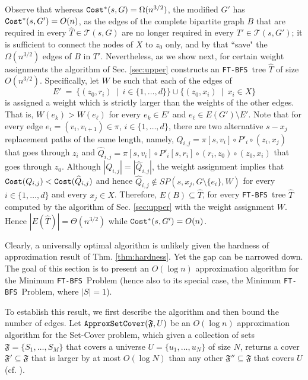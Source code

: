 \documentclass[12pt]{article}
\def\Set{\mathfrak{F}}
\def\Cost{\mbox{\tt Cost}}
\def\FTBFS{\mbox{\tt FT-BFS}}
\def\ApproxSetCover{\mbox{\tt ApproxSetCover}}
\begin{document}
Observe that whereas $\Cost^*(s, G)=\Omega(n^{3/2})$,
the modified $G'$ has $\Cost^*(s, G')=O(n)$, as the edges of the
complete bipartite graph $B$ that are required in
every $\widehat{T} \in \mathcal{T}(s,G)$
are no longer required in every $T' \in \mathcal{T}(s,G')$;
it is sufficient to connect the nodes of $X$ to $z_0$ only,
and by that ``save" the $\Omega(n^{3/2})$ edges of $B$ in $T'$.
Nevertheless, as we show next, for certain weight assignments the algorithm of
Sec. \ref{sec:upper} constructs an \FTBFS\ tree $\widehat{T}$ of size
$O(n^{3/2})$.
Specifically, let $W$ be such that each of the edges of
$$E' ~=~
\{(z_0,r_i) ~\mid~ i\in \{1, \ldots, d\}\} \cup \{(z_0,x_i) ~\mid~ x_i \in X\}$$
is assigned a weight which is strictly larger than the weights of the other edges. That is, $W(e_k)>W(e_\ell)$ for every $e_k \in E'$ and
$e_{\ell} \in E(G')\setminus E'$.
Note that for every edge $e_i=(v_{i}, v_{i+1})\in \pi$, $i \in \{1, \ldots,d\}$,
there are two alternative $s-x_j$ replacement paths of the same length, namely,
$Q_{i,j}=\pi[s, v_i] \circ P'_i \circ (z_i, x_j)$ that goes through $z_i$
and $\widehat{Q}_{i,j}=\pi[s, v_i] \circ P'_i[s, r_i] \circ (r_i,z_0) \circ (z_0,x_i)$
that goes through $z_0$. Although $|Q_{i,j}|=|\widehat{Q}_{i,j}|$,
the weight assignment implies that
$\Cost(Q_{i,j})<\Cost(\widehat{Q}_{i,j})$
and hence $\widehat{Q}_{i,j} \notin SP(s, x_j, G \setminus \{e_i\},W)$ for
every $i \in \{1, \ldots,d\}$ and every $x_j \in X$.
Therefore, $E(B) \subseteq  \widehat{T}$, for every \FTBFS\ tree
$\widehat{T}$ computed by the
algorithm of Sec. \ref{sec:upper} with the weight assignment $W$.
Hence $|E(\widehat{T})|=\Theta(n^{3/2})$ while $\Cost^*(s, G')=O(n)$.

Clearly, a universally optimal algorithm is unlikely given the hardness
of approximation result of Thm. \ref{thm:hardness}.
Yet the gap can be narrowed down.
The goal of this section is to present an $O(\log n)$ approximation algorithm
for the Minimum \FTBFS\ Problem (hence also to its special case,
the Minimum \FTBFS\ Problem, where $|S|=1$).

To establish this result, we first describe the algorithm and
then bound the number of edges.
Let $\ApproxSetCover(\Set,U)$ be an $O(\log n)$
approximation algorithm for the Set-Cover problem,
which given a collection of sets $\Set=\{S_1, \ldots, S_{M}\}$
that covers a universe $U=\{u_1, \ldots, u_N\}$ of size $N$, returns a cover
$\Set' \subseteq \Set$ that is larger by at most
$O(\log N)$ than any other $\Set'' \subseteq \Set$ that covers $U$ (cf. \cite{Vazirani97}).
\end{document}
